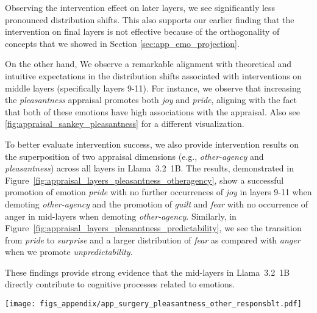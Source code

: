 Observing the intervention effect on later layers, we see significantly less pronounced distribution shifts. This also supports our earlier finding that the intervention on final layers is not effective because of the orthogonality of concepts that we showed in Section \ref{sec:app_emo_projection}. 

On the other hand, We observe a remarkable alignment with theoretical and intuitive expectations in the distribution shifts associated with interventions on middle layers (specifically layers 9-11). For instance, we observe that increasing the \textit{pleasantness} appraisal promotes both \textit{joy} and \textit{pride}, aligning with the fact that both of these emotions have high associations with the appraisal. Also see \ref{fig:appraisal_sankey_pleasantness} for a different visualization.

To better evaluate intervention success, we also provide intervention results on the superposition of two appraisal dimensions (e.g., \textit{other-agency} and \textit{pleasantness}) across all layers in Llama~3.2~1B. The results, demonstrated in Figure~\ref{fig:appraisal_layers_pleasantness_otheragency}, show a successful promotion of emotion \textit{pride} with no further occurrences of \textit{joy} in layers 9-11 when demoting \textit{other-agency} and the promotion of \textit{guilt} and \textit{fear} with no occurrence of anger in mid-layers when demoting \textit{other-agency}. Similarly, in Figure~\ref{fig:appraisal_layers_pleasantness_predictability}, we see the transition from \textit{pride} to \textit{surprise} and a larger distribution of \textit{fear} as compared with \textit{anger} when we promote \textit{unpredictability}.

These findings provide strong evidence that the mid-layers in Llama~3.2~1B directly contribute to cognitive processes related to emotions. 

\begin{figure*}[htbp]
    \centering
    \texttt{[image: figs\_appendix/app\_surgery\_pleasantness\_other\_responsblt.pdf]}
  \caption{Superposition of \textit{pleasantness} and \textit{other-agency} appraisal modulation at different layers of Llama~3.2~1B. Results show successful promotion of \textit{pride} with no further occurrences of \textit{joy} in layers 9–11 when demoting \textit{other-agency}, and the promotion of \textit{guilt} and \textit{fear} with no occurrences of \textit{anger} in mid-layers when demoting \textit{other-agency}.}
  \label{fig:appraisal_layers_pleasantness_otheragency}
\end{figure*} 


